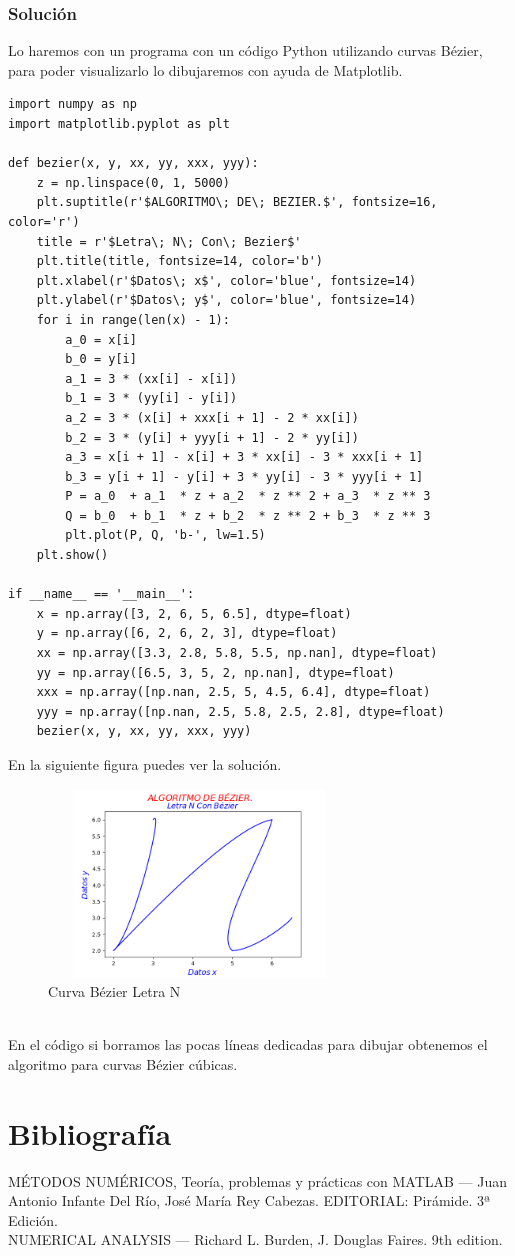 \documentclass[12pt,a4paper,oneside]{scrbook}
\newcounter{ns}
\begin{document}
\subsubsection*{Solución}
Lo haremos con un programa con un código Python utilizando curvas Bézier, para poder visualizarlo lo dibujaremos con ayuda de Matplotlib.
\begin{lstlisting}[frame=none]
import numpy as np
import matplotlib.pyplot as plt

def bezier(x, y, xx, yy, xxx, yyy):
    z = np.linspace(0, 1, 5000)
    plt.suptitle(r'$ALGORITMO\; DE\; BEZIER.$', fontsize=16, color='r')
    title = r'$Letra\; N\; Con\; Bezier$'
    plt.title(title, fontsize=14, color='b')
    plt.xlabel(r'$Datos\; x$', color='blue', fontsize=14)
    plt.ylabel(r'$Datos\; y$', color='blue', fontsize=14)
    for i in range(len(x) - 1):
        a_0 = x[i]
        b_0 = y[i]
        a_1 = 3 * (xx[i] - x[i])
        b_1 = 3 * (yy[i] - y[i])
        a_2 = 3 * (x[i] + xxx[i + 1] - 2 * xx[i])
        b_2 = 3 * (y[i] + yyy[i + 1] - 2 * yy[i])
        a_3 = x[i + 1] - x[i] + 3 * xx[i] - 3 * xxx[i + 1]
        b_3 = y[i + 1] - y[i] + 3 * yy[i] - 3 * yyy[i + 1]
        P = a_0  + a_1  * z + a_2  * z ** 2 + a_3  * z ** 3
        Q = b_0  + b_1  * z + b_2  * z ** 2 + b_3  * z ** 3
        plt.plot(P, Q, 'b-', lw=1.5)
    plt.show()

if __name__ == '__main__':
    x = np.array([3, 2, 6, 5, 6.5], dtype=float)
    y = np.array([6, 2, 6, 2, 3], dtype=float)
    xx = np.array([3.3, 2.8, 5.8, 5.5, np.nan], dtype=float)
    yy = np.array([6.5, 3, 5, 2, np.nan], dtype=float)
    xxx = np.array([np.nan, 2.5, 5, 4.5, 6.4], dtype=float)
    yyy = np.array([np.nan, 2.5, 5.8, 2.5, 2.8], dtype=float)
    bezier(x, y, xx, yy, xxx, yyy)
\end{lstlisting}
En la siguiente figura puedes ver la solución.
\begin{figure}[h!]
    \centering
    \includegraphics[width=8cm,height=5cm]{BezierN.png}
    \caption{Curva Bézier Letra N}
    \label{fig:spline}
\end{figure}\\
En el código si borramos las pocas líneas dedicadas para dibujar obtenemos el algoritmo para curvas Bézier cúbicas.
\section{Bibliografía}
MÉTODOS NUMÉRICOS, Teoría, problemas y prácticas con MATLAB --- Juan Antonio Infante Del Río, José María Rey Cabezas. EDITORIAL: Pirámide. 3ª Edición.\\
NUMERICAL ANALYSIS --- Richard L. Burden, J. Douglas Faires. 9th edition.
\end{document}
